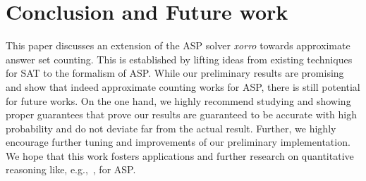 \documentclass{article}
\newcommand{\sysfont}{\textit}
\newcommand{\xorro}{\sysfont{xorro}}
\begin{document}
\section{Conclusion and Future work} \label{sec:conclusion}
This paper discusses an extension of the ASP solver \xorro{}
towards approximate answer set counting. This is established by lifting ideas from existing techniques for SAT to the formalism of ASP.
While our preliminary results are promising and show that
indeed approximate counting works for ASP, there is still potential for future works.
On the one hand, we highly recommend studying and showing
proper guarantees that prove our results are guaranteed to be accurate with high probability and do not deviate far from the actual result.
Further, we highly encourage further tuning and improvements of our preliminary implementation.
We hope that this work fosters applications and further research on quantitative reasoning like, e.g.,~\cite{KimmigDRCR11,TsamouraGK20}, for ASP.



\end{document}
